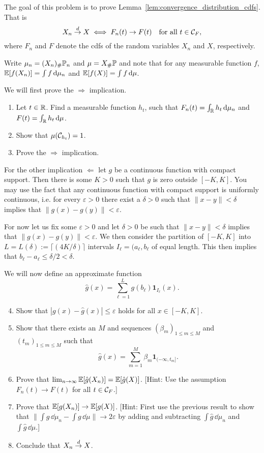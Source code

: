 \begin{problem}\label{prb:convergence_distribution}
The goal of this problem is to prove Lemma~\ref{lem:convergence_distribution_cdfs}. That is
\[
	X_n \stackrel{d}{\rightarrow} X \iff F_n(t) \to F(t) \quad \text{for all } t \in \mathcal C_F,
\]
where $F_n$ and $F$ denote the cdfs of the random variables $X_n$ and $X$, respectively.

Write $\mu_n = (X_n)_\# \mathbb P_n$ and $\mu = X_\# \mathbb P$ and note that for any measurable function $f$, $\mathbb E[f(X_n)] = \int f \, \mathrm{d} \mu_n$ and $\mathbb E[f(X)] = \int f \, \mathrm{d} \mu$.

We will first prove the $\Rightarrow$ implication. 
\begin{enumerate}[label={(\alph*)}]
\item Let $t \in \mathbb R$. Find a measurable function $h_t$, such that $F_n(t) = \int_{\mathbb R} h_t \, \mathrm{d} \mu_n$ and $F(t) = \int_{\mathbb R} h_t \, \mathrm{d} \mu$.
\item Show that $\mu(\mathcal C_{h_t}) = 1$.
\item Prove the $\Rightarrow$ implication. 
\end{enumerate}

For the other implication $\Leftarrow$ let $g$ be a continuous function with compact support. Then there is some $K > 0$ such that $g$ is zero outside $[-K,K]$. You may use the fact that any continuous function with compact support is uniformly continuous, i.e. for every $\varepsilon > 0$ there exist a $\delta > 0$ such that $\|x-y\| < \delta$ implies that $\|g(x) - g(y)\| < \varepsilon$. 

For now let us fix some $\varepsilon > 0$ and let $\delta > 0$ be such that $\|x-y\| < \delta$ implies that $\|g(x) - g(y)\| < \varepsilon$. We then consider the partition of $[-K,K]$ into $L = L(\delta) := \lceil (4K/\delta) \rceil$ intervals $I_\ell = (a_\ell, b_\ell$ of equal length. This then implies that $b_\ell - a_\ell \le \delta/2 < \delta$.

We will now define an approximate function
\[
	\hat{g}(x) = \sum_{\ell = 1}^L g(b_\ell) \mathbf{1}_{I_\ell}(x).
\]
 
\begin{enumerate}[label={(\alph*)}]
\setcounter{enumi}{3}
\item Show that $|g(x) - \hat{g}(x)| \le \varepsilon$ holds for all $x \in [-K , K]$.
\item Show that there exists an $M$ and sequences $(\beta_m)_{1 \le m \le M}$ and $(t_m)_{1 \le m \le M}$ such that
\[
	\hat{g}(x) = \sum_{m = 1}^M \beta_m \mathbf{1}_{(-\infty, t_m]}.
\]
\item Prove that $\lim_{n \to \infty} \mathbb E[\hat{g}(X_n)] = \mathbb E[\hat{g}(X)]$. [Hint: Use the assumption $F_n(t) \to F(t)$ for all $t \in \mathcal C_F$.]
\item Prove that $\mathbb E[g(X_n)] \to \mathbb E[g(X)]$. [Hint: First use the previous result to show that $\| \int g \, \dd \mu_n - \int g \, \dd \mu\| \to 2\varepsilon$ by adding and subtracting $\int \hat{g} \, \dd \mu_n$ and $\int \hat{g} \, \dd \mu$.]
\item Conclude that $X_n \stackrel{d}{\rightarrow} X$.
\end{enumerate}
\end{problem}

